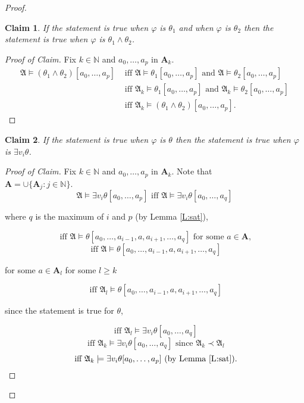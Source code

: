 \documentclass[titlepage, oneside]{amsbook}
\theoremstyle{plain}
\newtheorem*{claim}{Claim}
\theoremstyle{definition}
\theoremstyle{remark}
\newcommand{\ma}{\ensuremath{\mathfrak{A}}}
\newcommand{\ba}{\ensuremath{\mathbf{A}}}
\newcommand{\nat}{\ensuremath{\mathbb{N}}}
\newcommand{\anot}[2][0]{\ensuremath{ a_{#1} , \dots , a_{#2}}}
\newcommand{\ta}{\ensuremath{\theta}}
\newcommand{\vp}{\ensuremath{\varphi}}
\begin{document}
\begin{proof}
\begin{claim}  If the statement is true when $\varphi$ is $\theta_1$
and when $\varphi$ is $\theta_2$ then the statement is true when
$\varphi$
is $\theta_1 \wedge \theta_2$.
\end{claim}

\begin{proof}[Proof of Claim]  Fix $k \in \nat$ and $\anot p$ in $\ba_k
$.  \[ \begin{aligned} \ma \models ( \ta_1 \wedge \ta_2 ) [ \anot p ]
&\mbox{ iff } \ma \models \ta_1 [ \anot p ] \mbox{ and } \ma \models
\ta_2 [ \anot p ] \\
&\mbox{ iff }  \ma_k  \models \ta_1 [ \anot p ] \mbox{ and } \ma_k
\models \ta_2 [ \anot p ] \\
&\mbox{ iff }  \ma_k \models ( \ta_1 \wedge \ta_2 ) [ \anot p ] .
\end{aligned}
\]

\renewcommand{\qedsymbol}{}
\end{proof}


\begin{claim} If the statement is true when $\varphi$ is $\ta$ then the
statement is true when $\vp$ is $\exists v_i \ta$.
\end{claim}

\begin{proof}[Proof of Claim] Fix $k \in \nat$ and $\anot p$ in
$\ba_k$.  Note that \\
$\ba = \cup \{ \ba_j : j \in \nat \}$.
\[  \ma \models \exists v_i \ta [ \anot p ]  
 \mbox{ iff }
 \ma \models \exists v_i \ta [ \anot q ] \]
\begin{center} where $ q $ is the maximum of $ i$  and $ p$ (by Lemma 
\ref{L:sat}), \end{center}
\[\mbox{ iff } \ma \models \ta [ \anot{i - 1 } , a , \anot[i+1]{q} ] 
\mbox{ for some } a \in \ba, \]
\[\mbox{ iff } \ma \models \ta [ \anot{i-1}, a , \anot[i+1]{q} ] \]
\begin{center}  for some $ a \in \ba_l $ for some $ l \geq k $
\end{center}
\[\mbox{ iff } \ma_l \models \ta [ \anot{i-1}, a , \anot[ i+1]{q} ] \]
\begin{center} since the statement is true for $ \theta$, \end{center}
\[\mbox{ iff } \ma_l \models \exists v_i \ta [ \anot q ] \]
\[\mbox{ iff } \ma_k \models \exists v_i \theta [ \anot q ] 
 \mbox{ since } \ma_k \prec \ma_l  \]
\[ \mbox{ iff } \ma_k \models \exists v_i \ta [ \anot p ] \mbox{ (by
Lemma~\ref{L:sat})}. \]
\renewcommand{\qedsymbol}{}
\end{proof}


\end{proof}
\end{document}
